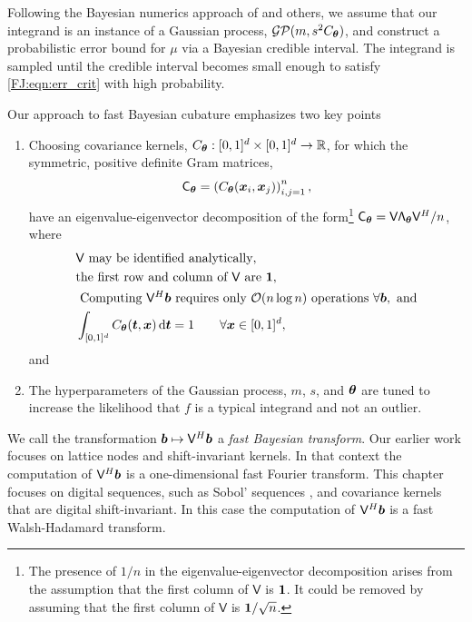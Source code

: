 \documentclass[graybox,footinfo]{svmult}
\begin{document}
Following the Bayesian numerics approach of \cite{BriEtal18a, Dia88a, OHa91a, RasGha03a} and others, we assume that our integrand is an instance of a Gaussian process, $\mathcal{GP}(m,s^2 C_{\boldsymbol{\theta}})$, and construct a probabilistic error bound for $\mu$ via a Bayesian credible interval.  The integrand is sampled until the credible interval becomes small enough to satisfy \eqref{FJ:eqn:err_crit} with high probability.  

Our approach to fast Bayesian cubature \cite{RatHic19a} emphasizes two key points
\begin{enumerate}
\renewcommand{\labelenumi}{\roman{enumi})}
    \item Choosing covariance kernels, $C_{\boldsymbol{\theta}}:[0,1]^d \times [0,1]^d \to {\mathbb{R}}$, for which the symmetric, positive definite Gram matrices, 
    \begin{equation} \label{FJ:eq:Gram}
        \mathsf{C}_\bstheta = \left(  C_\bstheta(\bsx_i,\bsx_j)  \right)_{i,j=1}^n,
    \end{equation}
    have an eigenvalue-eigenvector decomposition of the form\footnote{The presence of $1/n$ in the eigenvalue-eigenvector decomposition arises from the assumption that the first column of $\mathsf{V}$ is ${\boldsymbol{1}}$.  It could be removed by assuming that the first column of $\mathsf{V}$ is ${\boldsymbol{1}}/\sqrt{n}$.} $\mathsf{C}_{\boldsymbol{\theta}} = \mathsf{V} \mathsf{\Lambda}_{\boldsymbol{\theta}} \mathsf{V}^H/n$, where
    \begin{subequations} \label{FJ:eq:fastcompAssump}
	\begin{align}
	\label{FJ:eq:fastcompAssumpA}
	& \mathsf{V} \text{ may be identified analytically}, \\
	\label{FJ:eq:fastcompAssumpB}
	& \text{the first row and column of $\mathsf{V}$ are } \bsone, \\
	\label{FJ:eq:fastcompAssumpC}
	& \text{ Computing $\mathsf{V}^H \bsb$ requires only $\calO(n \log n)$ operations } \forall \bsb, \text{ and} \\
	\label{FJ:addAssump}
    & \int_{[0,1]^d} C_\bstheta(\bst,\bsx) \, \D \bst = 1 \qquad \forall \bsx \in [0,1]^d,
	\end{align}
\end{subequations}
and
\item The hyperparameters of the Gaussian process, $m$, $s$, and ${\boldsymbol{\theta}}$ are tuned to increase the likelihood that $f$ is a typical integrand and not an outlier.
\end{enumerate}
We call the transformation ${\boldsymbol{b}} \mapsto \mathsf{V}^H {\boldsymbol{b}}$ a \emph{fast Bayesian transform}. Our earlier work \cite{RatHic19a} focuses on lattice nodes and shift-invariant kernels. In that context the computation of $\mathsf{V}^H {\boldsymbol{b}}$ is a one-dimensional fast Fourier transform.  This chapter focuses on digital sequences, such as Sobol' sequences \cite{Sob67}, and covariance kernels that are digital shift-invariant.  In this case the computation of $\mathsf{V}^H {\boldsymbol{b}}$ is a fast Walsh-Hadamard transform. 
\end{document}
